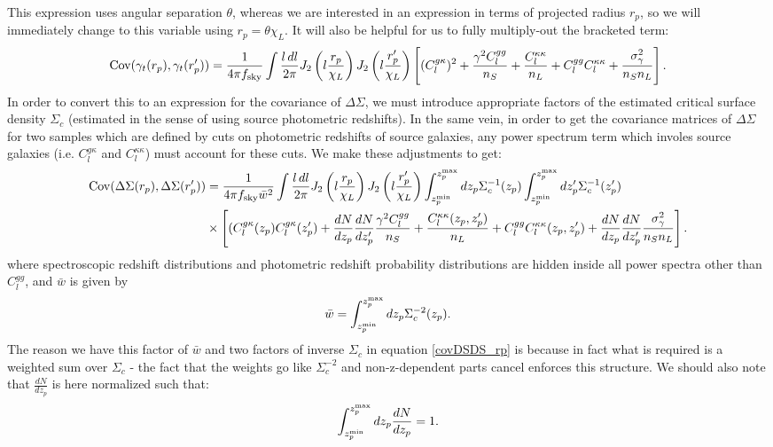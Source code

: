 \documentclass[onecolumn,amsmath,aps,fleqn, superscriptaddress]{revtex4}
\begin{document}
This expression uses angular separation $\theta$, whereas we are interested in an expression in terms of projected radius $r_p$, so we will immediately change to this variable using $r_p = \theta \chi_L$. It will also be helpful for us to fully multiply-out the bracketed term: 
\begin{equation}
{\rm Cov}(\gamma_t(r_p), \gamma_t(r_p^\prime)) = \frac{1}{4\pi f_{\rm sky}} \int \frac{l \, dl}{2\pi} J_2\left(l \frac{r_p}{\chi_L}\right) J_2 \left(l \frac{r_p^\prime}{\chi_L}\right) \left[ (C_l^{g \kappa})^2 + \frac{ \gamma^2 C_l^{gg}}{n_S} + \frac{C_l^{\kappa \kappa}}{n_L} + C_l^{gg} C_l^{\kappa \kappa} + \frac{\sigma_{\gamma}^2}{n_S n_L}\right].
\label{covgamgam_rp}
\end{equation}
In order to convert this to an expression for the covariance of $\Delta \Sigma$, we must introduce appropriate factors of the estimated critical surface density $\Sigma_c$ (estimated in the sense of using source photometric redshifts). In the same vein, in order to get the covariance matrices of $\Delta \Sigma$ for two samples which are defined by cuts on photometric redshifts of source galaxies, any power spectrum term which involes source galaxies (i.e. $C_l^{g\kappa}$ and $C_l^{\kappa \kappa}$) must account for these cuts. We make these adjustments to get:
\begin{align}
{\rm Cov}(\Delta \Sigma(r_p), \Delta \Sigma(r_p^\prime)) &= \frac{1}{4\pi f_{\rm sky}\bar{w}^2} \int \frac{l \, dl}{2\pi} J_2\left(l \frac{r_p}{\chi_L}\right) J_2 \left(l \frac{r_p^\prime}{\chi_L}\right) \int_{z_p^{\rm min}}^{z_p^{\rm max}} d z_p \Sigma_c^{-1}(z_p) \int_{z_p^{\rm min}}^{z_p^{\rm max}} dz_p^\prime \Sigma_c^{-1}(z_p^\prime)\nonumber \\ &\times \left[ (C_l^{g \kappa}(z_p)C_l^{g \kappa}(z_p^\prime)  + \frac{dN}{dz_p}\frac{dN}{dz_p^\prime}\frac{ \gamma^2 C_l^{gg}}{n_S} + \frac{C_l^{\kappa \kappa}(z_p, z_p^\prime)}{n_L} + C_l^{gg} C_l^{\kappa \kappa}(z_p, z_p^\prime) + \frac{dN}{dz_p}\frac{dN}{dz_p^\prime}\frac{\sigma_{\gamma}^2}{n_S n_L}\right].
\label{covDSDS_rp}
\end{align}
where spectroscopic redshift distributions and photometric redshift probability distributions are hidden inside all power spectra other than $C_l^{gg}$, and $\bar{w}$ is given by
\begin{equation}
\bar{w} = \int_{z_p^{\rm min}}^{z_p^{\rm max}} d z_p \Sigma_c^{-2}(z_p).
\label{wbar}
\end{equation}
The reason we have this factor of $\bar{w}$ and two factors of inverse $\Sigma_c$ in equation \ref{covDSDS_rp} is because in fact what is required is a weighted sum over $\Sigma_c$ - the fact that the weights go like $\Sigma_c^{-2}$ and non-z-dependent parts cancel enforces this structure. We should also note that $\frac{dN}{dz_p}$ is here normalized such that:
\begin{equation}
\int_{z_p^{\rm min}}^{z_p^{\rm max}} d z_p \frac{dN}{dz_p} = 1.
\end{equation}
\end{document}
